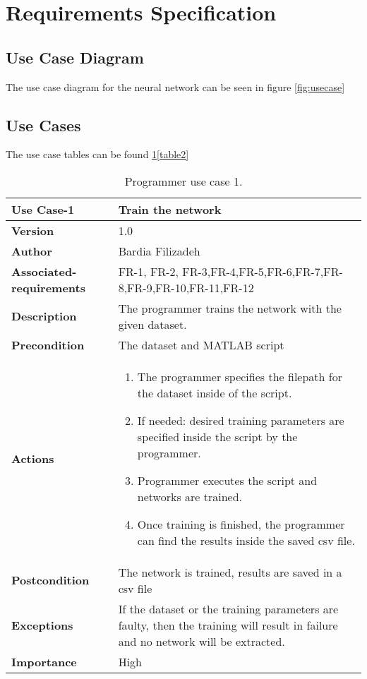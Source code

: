 \section{Requirements Specification}
\subsection{Use Case Diagram}
The use case diagram for the neural network can be seen in figure \ref{fig:usecase}
\subsection{Use Cases}
The use case tables can be found \ref{table1}\ref{table2}
\begin{table}[p]
	\centering
	\begin{tabularx}{\linewidth}{ p{} p{} }
		\toprule
		\textbf{Use Case-1}    & \textbf{Train the network}\\
		\toprule
		\textbf{Version}              & 1.0    \\
		\textbf{Author}                & Bardia Filizadeh \\
		\textbf{Associated-requirements} & FR-1, FR-2, FR-3,FR-4,FR-5,FR-6,FR-7,FR-8,FR-9,FR-10,FR-11,FR-12 \\
		\textbf{Description}          & The programmer trains the network with the given dataset. \\
		\textbf{Precondition}         & The dataset and MATLAB script \\
		\textbf{Actions}             &
		\begin{enumerate}
			\def\labelenumi{\arabic{enumi}.}
			\tightlist
			\item The programmer specifies the filepath for the dataset inside of the script.
			\item If needed: desired training parameters are specified inside the script by the programmer.
            \item Programmer executes the script and networks are trained.
            \item Once training is finished, the programmer can find the results inside the saved csv file.
		\end{enumerate}\\
		\textbf{Postcondition}        & The network is trained, results are saved in a csv file \\
		\textbf{Exceptions}          & If the dataset or the training parameters are faulty, then the training will result in failure and no network will be extracted. \\
		\textbf{Importance}          & High \\
		\bottomrule
	\end{tabularx}
	\caption{Programmer use case 1.} \label{table1}
\end{table}

